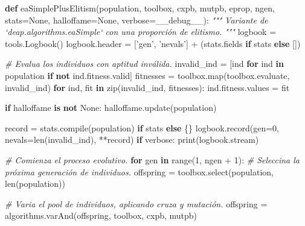 \documentclass[11pt]{article}
\newenvironment{Shaded}{}{}
\newcommand{\KeywordTok}[1]{\textcolor[rgb]{0.00,0.44,0.13}{\textbf{{#1}}}}
\newcommand{\DecValTok}[1]{\textcolor[rgb]{0.25,0.63,0.44}{{#1}}}
\newcommand{\StringTok}[1]{\textcolor[rgb]{0.25,0.44,0.63}{{#1}}}
\newcommand{\CommentTok}[1]{\textcolor[rgb]{0.38,0.63,0.69}{\textit{{#1}}}}
\newcommand{\NormalTok}[1]{{#1}}
\newcommand{\VariableTok}[1]{\textcolor[rgb]{0.10,0.09,0.49}{{#1}}}
\newcommand{\ControlFlowTok}[1]{\textcolor[rgb]{0.00,0.44,0.13}{\textbf{{#1}}}}
\newcommand{\OperatorTok}[1]{\textcolor[rgb]{0.40,0.40,0.40}{{#1}}}
\newcommand{\BuiltInTok}[1]{{#1}}
\begin{document}
\begin{Shaded}
\begin{Highlighting}[]
{\KeywordTok{def}\NormalTok{ eaSimplePlusElitism(population, toolbox, cxpb, mutpb, eprop, ngen,}
\NormalTok{                        stats}\OperatorTok{=}\VariableTok{None}\NormalTok{, halloffame}\OperatorTok{=}\VariableTok{None}\NormalTok{, verbose}\OperatorTok{=}\VariableTok{__debug__}\NormalTok{):}
    \CommentTok{"""}
\CommentTok{    Variante de `deap.algorithms.eaSimple` con una proporción de elitismo.}
\CommentTok{    """}
\NormalTok{    logbook }\OperatorTok{=}\NormalTok{ tools.Logbook()}
\NormalTok{    logbook.header }\OperatorTok{=}\NormalTok{ [}\StringTok{'gen'}\NormalTok{, }\StringTok{'nevals'}\NormalTok{] }\OperatorTok{+}\NormalTok{ (stats.fields }\ControlFlowTok{if}\NormalTok{ stats }\ControlFlowTok{else}\NormalTok{ [])}

    \CommentTok{# Evalua los individuos con aptitud inválida.}
\NormalTok{    invalid_ind }\OperatorTok{=}\NormalTok{ [ind }\ControlFlowTok{for}\NormalTok{ ind }\KeywordTok{in}\NormalTok{ population }\ControlFlowTok{if} \KeywordTok{not}\NormalTok{ ind.fitness.valid]}
\NormalTok{    fitnesses }\OperatorTok{=}\NormalTok{ toolbox.}\BuiltInTok{map}\NormalTok{(toolbox.evaluate, invalid_ind)}
    \ControlFlowTok{for}\NormalTok{ ind, fit }\KeywordTok{in} \BuiltInTok{zip}\NormalTok{(invalid_ind, fitnesses):}
\NormalTok{        ind.fitness.values }\OperatorTok{=}\NormalTok{ fit}

    \ControlFlowTok{if}\NormalTok{ halloffame }\KeywordTok{is} \KeywordTok{not} \VariableTok{None}\NormalTok{:}
\NormalTok{        halloffame.update(population)}

\NormalTok{    record }\OperatorTok{=}\NormalTok{ stats.}\BuiltInTok{compile}\NormalTok{(population) }\ControlFlowTok{if}\NormalTok{ stats }\ControlFlowTok{else}\NormalTok{ \{\}}
\NormalTok{    logbook.record(gen}\OperatorTok{=}\DecValTok{0}\NormalTok{, nevals}\OperatorTok{=}\BuiltInTok{len}\NormalTok{(invalid_ind), }\OperatorTok{**}\NormalTok{record)}
    \ControlFlowTok{if}\NormalTok{ verbose:}
        \BuiltInTok{print}\NormalTok{(logbook.stream)}

    \CommentTok{# Comienza el proceso evolutivo.}
    \ControlFlowTok{for}\NormalTok{ gen }\KeywordTok{in} \BuiltInTok{range}\NormalTok{(}\DecValTok{1}\NormalTok{, ngen }\OperatorTok{+} \DecValTok{1}\NormalTok{):}
        \CommentTok{# Seleccina la próxima generación de individuos.}
\NormalTok{        offspring }\OperatorTok{=}\NormalTok{ toolbox.select(population, }\BuiltInTok{len}\NormalTok{(population))}

        \CommentTok{# Varia el pool de individuos, aplicando cruza y mutación.}
\NormalTok{        offspring }\OperatorTok{=}\NormalTok{ algorithms.varAnd(offspring, toolbox, cxpb, mutpb)}

}
\end{Highlighting}
\end{Shaded}
\end{document}
